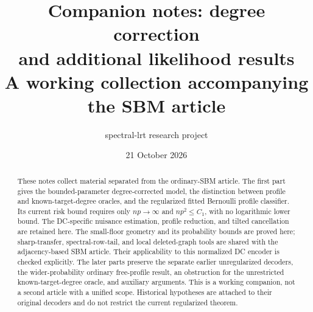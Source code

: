 \documentclass[11pt]{article}
\title{Companion notes: degree correction\\and additional likelihood results\\
\large A working collection accompanying the SBM article}
\author{spectral-lrt research project}
\date{21 October 2026}
\theoremstyle{definition}
\theoremstyle{remark}
\begin{document}
\maketitle
\begin{abstract}
These notes collect material separated from the ordinary-SBM article.
The first part gives the bounded-parameter degree-corrected model,
the distinction between profile and known-target-degree oracles,
and the regularized fitted Bernoulli profile classifier. Its current
risk bound requires only $np\to\infty$ and $np^2\le C_1$, with no
logarithmic lower bound. The DC-specific nuisance estimation,
profile reduction, and tilted cancellation are retained here.
The small-floor geometry and its probability bounds are proved here;
sharp-transfer, spectral-row-tail, and local deleted-graph tools are
shared with the adjacency-based SBM article. Their applicability to
this normalized DC encoder is checked explicitly.
The later parts preserve the separate earlier unregularized decoders,
the wider-probability ordinary free-profile result, an obstruction for
the unrestricted known-target-degree oracle, and auxiliary arguments.
This is a working companion, not a second article with a unified scope.
Historical hypotheses are attached to their original decoders and do
not restrict the current regularized theorem.
\end{abstract}
\end{document}
